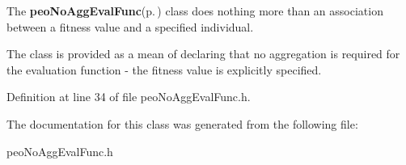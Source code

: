The {\bf peo\-No\-Agg\-Eval\-Func}{\rm (p.\,\pageref{classpeo_no_agg_eval_func})} class does nothing more than an association between a fitness value and a specified individual. 

The class is provided as a mean of declaring that no aggregation is required for the evaluation function - the fitness value is explicitly specified. 



Definition at line 34 of file peo\-No\-Agg\-Eval\-Func.h.

The documentation for this class was generated from the following file:\begin{CompactItemize}
\item 
peo\-No\-Agg\-Eval\-Func.h\end{CompactItemize}
